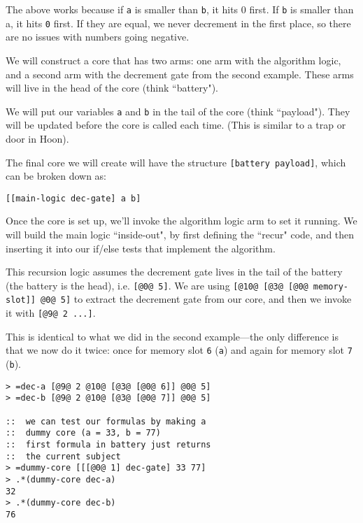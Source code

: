 \documentclass[twoside]{article}
\begin{document}
The above works because if \lstinline[style=inlinecode]{a} is smaller than \lstinline[style=inlinecode]{b}, it hits 0 first. If \lstinline[style=inlinecode]{b} is smaller than a, it hits \lstinline[style=inlinecode]{0} first. If they are equal, we never decrement in the first place, so there are no issues with numbers going negative.

We will construct a core that has two arms: one arm with the algorithm logic, and a second arm with the decrement gate from the second example. These arms will live in the head of the core (think ``battery").

We will put our variables \lstinline[style=inlinecode]{a} and \lstinline[style=inlinecode]{b} in the tail of the core (think ``payload"). They will be updated before the core is called each time. (This is similar to a trap or door in Hoon).

The final core we will create will have the structure \lstinline[style=inlinecode]{[battery payload]}, which can be broken down as:

\begin{lstlisting}[style=listingcode]
[[main-logic dec-gate] a b]
\end{lstlisting}

Once the core is set up, we'll invoke the algorithm logic arm to set it running.  We will build the main logic ``inside-out", by first defining the ``recur" code, and then inserting it into our if/else tests that implement the algorithm.

This recursion logic assumes the decrement gate lives in the tail of the battery (the battery is the head), i.e. \lstinline[style=inlinecode]{[@0@ 5]}. We are using \lstinline[style=inlinecode]{[@10@ [@3@ [@0@ memory-slot]] @0@ 5]} to extract the decrement gate from our core, and then we invoke it with \lstinline[style=inlinecode]{[@9@ 2 ...]}.

This is identical to what we did in the second example—the only difference is that we now do it twice: once for memory slot \lstinline[style=inlinecode]{6} (\lstinline[style=inlinecode]{a}) and again for memory slot \lstinline[style=inlinecode]{7} (\lstinline[style=inlinecode]{b}).

\begin{lstlisting}[style=listingcode]
> =dec-a [@9@ 2 @10@ [@3@ [@0@ 6]] @0@ 5]
> =dec-b [@9@ 2 @10@ [@3@ [@0@ 7]] @0@ 5]

::  we can test our formulas by making a
::  dummy core (a = 33, b = 77)
::  first formula in battery just returns
::  the current subject
> =dummy-core [[[@0@ 1] dec-gate] 33 77]
> .*(dummy-core dec-a)
32
> .*(dummy-core dec-b)
76
\end{lstlisting}
\end{document}
